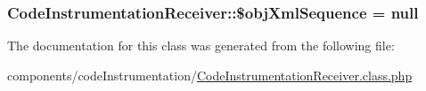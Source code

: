 \hypertarget{class_code_instrumentation_receiver_7e81a184fa4092dd95506d434c2660ff}{
\subsubsection[{\$objXmlSequence}]{\setlength{\rightskip}{0pt plus 5cm}CodeInstrumentationReceiver::\$objXmlSequence = null}}
\label{class_code_instrumentation_receiver_7e81a184fa4092dd95506d434c2660ff}




The documentation for this class was generated from the following file:\begin{CompactItemize}
\item 
components/codeInstrumentation/\hyperlink{_code_instrumentation_receiver_8class_8php}{CodeInstrumentationReceiver.class.php}\end{CompactItemize}
